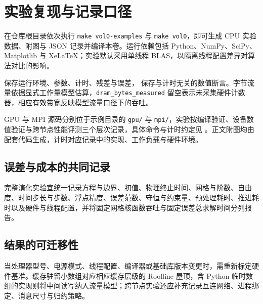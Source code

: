 \chapter{实验复现与记录口径}
在仓库根目录依次执行 \texttt{make vol0-examples} 与 \texttt{make vol0}，即可生成 CPU 实验数据、附图与 JSON 记录并编译本卷。运行依赖包括 Python、NumPy、SciPy、Matplotlib 与 XeLaTeX；实验默认采用单线程 BLAS，以隔离线程配置差异对算法对比的影响。
\par
{} 保存运行环境、参数、计时、残差与误差， 保存与计时无关的数值断言。字节流量依据显式工作量模型估算，\texttt{dram\_bytes\_measured} 留空表示未采集硬件计数器，相应有效带宽反映模型流量口径下的吞吐。
\par
GPU 与 MPI 源码分别位于示例目录的 \texttt{gpu/} 与 \texttt{mpi/}，实验按编译验证、设备数值验证与跨节点性能评测三个层次记录，具体命令与计时约定见 。正文附图均由配套代码生成，计时对应记录中的实现、工作负载与硬件环境。
\section{误差与成本的共同记录}
完整演化实验宜统一记录方程与边界、初值、物理终止时间、网格与阶数、自由度、时间步长与步数、浮点精度、误差范数、守恒与约束量、预处理耗时、推进耗时以及硬件与线程配置，并将固定网格核函数吞吐与固定误差总求解时间分列报告。
\section{结果的可迁移性}
当处理器型号、电源模式、线程配置、编译器或基础库版本变更时，需重新标定硬件基准。缓存驻留小数组对应相应缓存层级的 Roofline 屋顶，含 Python 临时数组的实现则将中间读写纳入流量模型；跨节点实验还应补充记录互连网络、进程绑定、消息尺寸与归约策略。
